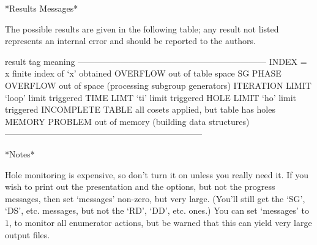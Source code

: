 *Results Messages*

The possible results are given in the following table; any result  not
listed represents an internal error and  should  be  reported  to  the
{\ACE} authors.

\begintt
result tag           meaning 
------------------------------------------------------------------
INDEX = x            finite index of `x' obtained
OVERFLOW             out of table space
SG PHASE OVERFLOW    out of space (processing subgroup generators)
ITERATION LIMIT      `loop' limit triggered
TIME LIMT            `ti' limit triggered
HOLE LIMIT           `ho' limit triggered
INCOMPLETE TABLE     all cosets applied, but table has holes
MEMORY PROBLEM       out of memory (building data structures)
---------------------------------------------------------------------
\endtt


*Notes*

Hole monitoring is expensive, so don't turn it on  unless  you  really
need it. If you wish to print out the presentation  and  the  options,
but not the progress messages, then set `messages' non-zero, but  very
large. (You'll still get the `SG', `DS', etc. messages,  but  not  the
`RD', `DD', etc. ones.) You can set `messages' to $1$, to monitor  all
enumerator actions, but be warned  that  this  can  yield  very  large
output files.

